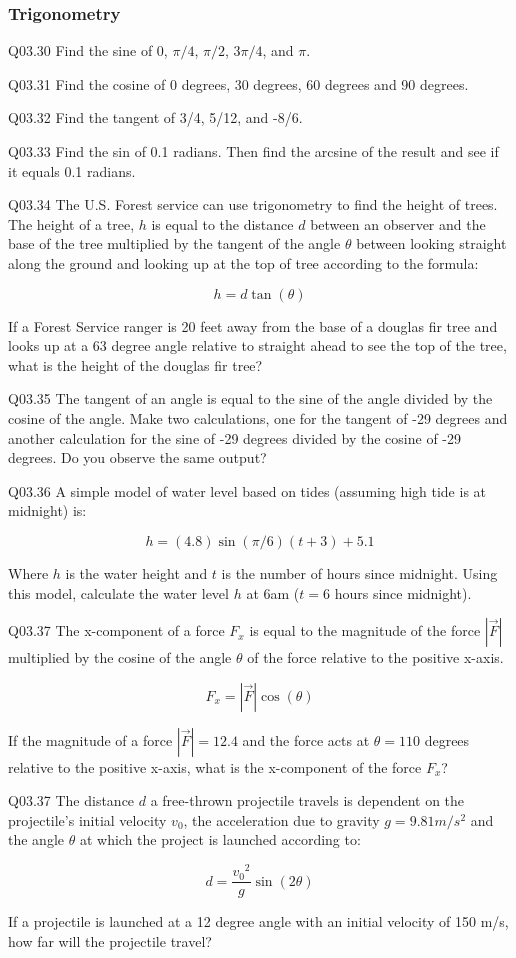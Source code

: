 \documentclass{book}
\newenvironment{problems}{}{}  %
\begin{document}
    
        \begin{problems}
        \hypertarget{trigonometry}{%
\subsubsection{Trigonometry}\label{trigonometry}}

Q03.30 Find the sine of \(0\), \(\pi/4\), \(\pi/2\), \(3\pi/4\), and
\(\pi\).

Q03.31 Find the cosine of 0 degrees, 30 degrees, 60 degrees and 90
degrees.

Q03.32 Find the tangent of 3/4, 5/12, and -8/6.

Q03.33 Find the sin of 0.1 radians. Then find the arcsine of the result
and see if it equals 0.1 radians.

Q03.34 The U.S. Forest service can use trigonometry to find the height
of trees. The height of a tree, \(h\) is equal to the distance \(d\)
between an observer and the base of the tree multiplied by the tangent
of the angle \(\theta\) between looking straight along the ground and
looking up at the top of tree according to the formula:

\[ h = d\tan(\theta) \]

If a Forest Service ranger is 20 feet away from the base of a douglas
fir tree and looks up at a 63 degree angle relative to straight ahead to
see the top of the tree, what is the height of the douglas fir tree?

Q03.35 The tangent of an angle is equal to the sine of the angle divided
by the cosine of the angle. Make two calculations, one for the tangent
of -29 degrees and another calculation for the sine of -29 degrees
divided by the cosine of -29 degrees. Do you observe the same output?

Q03.36 A simple model of water level based on tides (assuming high tide
is at midnight) is:

\[ h = (4.8)\sin(\pi/6)(t+3)+5.1 \]

Where \(h\) is the water height and \(t\) is the number of hours since
midnight. Using this model, calculate the water level \(h\) at 6am
(\(t=6\) hours since midnight).

Q03.37 The x-component of a force \(F_x\) is equal to the magnitude of
the force \(|\vec{F}|\) multiplied by the cosine of the angle \(\theta\)
of the force relative to the positive x-axis.

\[ F_x = |\vec{F}|\cos(\theta) \]

If the magnitude of a force \(|\vec{F}| = 12.4\) and the force acts at
\(\theta=110\) degrees relative to the positive x-axis, what is the
x-component of the force \(F_x\)?

Q03.37 The distance \(d\) a free-thrown projectile travels is dependent
on the projectile's initial velocity \(v_0\), the acceleration due to
gravity \(g=9.81 m/s^2\) and the angle \(\theta\) at which the project
is launched according to:

\[ d = \frac{{v_0}^2}{g} \sin(2\theta) \]

If a projectile is launched at a 12 degree angle with an initial
velocity of 150 m/s, how far will the projectile travel?
        \end{problems}
\end{document}
